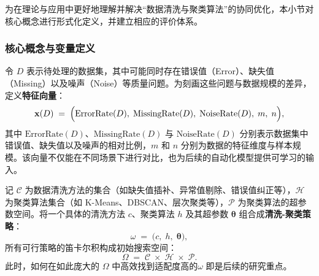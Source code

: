 \documentclass[10pt]{article} %
\numberwithin{equation}{section}
\begin{document}
为在理论与应用中更好地理解并解决“数据清洗与聚类算法”的协同优化，本小节对核心概念进行形式化定义，并建立相应的评价体系。

\subsubsection{核心概念与变量定义}
令 \(D\) 表示待处理的数据集，其中可能同时存在错误值（Error）、缺失值（Missing）以及噪声（Noise）等质量问题。为刻画这些问题与数据规模的差异，定义\textbf{特征向量}：
\begin{equation}\label{eq:xD}
  \mathbf{x}(D) 
  \;=\; 
  \Bigl(\mathrm{ErrorRate}(D),\;\mathrm{MissingRate}(D),\;\mathrm{NoiseRate}(D),\; m,\; n\Bigr),
\end{equation}
其中 \(\mathrm{ErrorRate}(D)\)、\(\mathrm{MissingRate}(D)\) 与 \(\mathrm{NoiseRate}(D)\) 分别表示数据集中错误值、缺失值以及噪声的相对比例，\(m\) 和 \(n\) 分别为数据的特征维度与样本规模。该向量不仅能在不同场景下进行对比，也为后续的自动化模型提供可学习的输入。

记 \(\mathcal{C}\) 为数据清洗方法的集合（如缺失值插补、异常值剔除、错误值纠正等），\(\mathcal{H}\) 为聚类算法集合（如 K-Means、DBSCAN、层次聚类等），\(\mathcal{P}\) 为聚类算法的超参数空间。将一个具体的清洗方法 \(c\)、聚类算法 \(h\) 及其超参数 \(\boldsymbol{\theta}\) 组合成\textbf{清洗-聚类策略}：
\begin{equation}\label{eq:omega}
  \omega 
  \;=\; 
  \bigl(c,\; h,\; \boldsymbol{\theta}\bigr),
\end{equation}
所有可行策略的笛卡尔积构成初始搜索空间：
\begin{equation}\label{eq:Omega}
  \Omega 
  \;=\; 
  \mathcal{C} \;\times\; \mathcal{H} \;\times\; \mathcal{P}.
\end{equation}
此时，如何在如此庞大的 \(\Omega\) 中高效找到适配度高的\(\omega\) 即是后续的研究重点。
\end{document}

